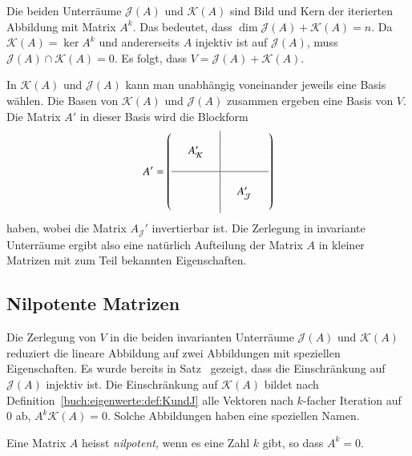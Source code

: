Die beiden Unterräume $\mathcal{J}(A)$ und $\mathcal{K}(A)$
sind Bild und Kern der iterierten Abbildung mit Matrix $A^k$.
Das bedeutet, dass $\dim\mathcal{J}(A)+\mathcal{K}(A)=n$.
Da $\mathcal{K}(A)=\ker A^k$ und andererseits $A$ injektiv ist auf
$\mathcal{J}(A)$, muss $\mathcal{J}(A)\cap\mathcal{K}(A)=0$.
Es folgt, dass $V=\mathcal{J}(A) + \mathcal{K}(A)$.

In $\mathcal{K}(A)$ und $\mathcal{J}(A)$ kann man unabhängig voneinander
jeweils eine Basis wählen.
Die Basen von $\mathcal{K}(A)$ und $\mathcal{J}(A)$ zusammen ergeben
eine Basis von $V$.
Die Matrix $A'$ in dieser Basis wird die Blockform
\[
A'
=
\left(
\begin{array}{ccc|ccc}
&&&&&\\
&A'_{\mathcal{K}}&&&&\\
&&&&&\\
\hline
&&&&&\\
&&&&A'_{\mathcal{J}}&\\
&&&&&\\
\end{array}
\right)
\]
haben, wobei die Matrix $A_\mathcal{J}'$ invertierbar ist.
Die Zerlegung in invariante Unterräume ergibt also eine natürlich
Aufteilung der Matrix $A$ in kleiner Matrizen mit zum Teil bekannten
Eigenschaften.

%
%
\subsection{Nilpotente Matrizen
\label{buch:subsection:nilpotente-matrizen}}
Die Zerlegung von $V$ in die beiden invarianten Unterräume $\mathcal{J}(A)$
und $\mathcal{K}(A)$ reduziert die lineare Abbildung auf zwei Abbildungen
mit speziellen Eigenschaften.
Es wurde bereits in Satz~\label{buch:eigenwerte:satz:fJinj} gezeigt,
dass die Einschränkung auf $\mathcal{J}(A)$ injektiv ist.
Die Einschränkung auf $\mathcal{K}(A)$ bildet nach
Definition~\ref{buch:eigenwerte:def:KundJ} alle
Vektoren nach $k$-facher Iteration auf $0$ ab, $A^k\mathcal{K}(A)=0$.
Solche Abbildungen haben eine speziellen Namen.

\begin{definition}
\label{buch:eigenwerte:def:nilpotent}
Eine Matrix $A$ heisst {\em nilpotent}, wenn es eine Zahl $k$ gibt, so dass
$A^k=0$.
%
\end{definition}

